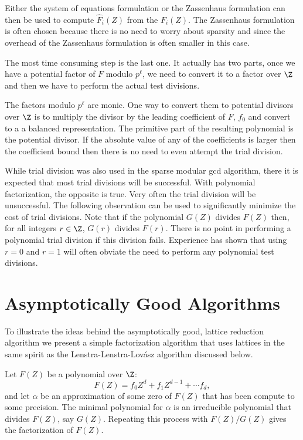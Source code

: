 Either the system of equations formulation or the Zassenhaus
formulation can then be used to compute $\hat{F}_i(Z)$ from the
$F_i(Z)$.  The Zassenhaus formulation is often chosen because there is
no need to worry about sparsity and since the overhead of the
Zassenhaus formulation is often smaller in this case.

The most time consuming step is the last one.  It actually has two
parts, once we have a potential factor of $F$ modulo $p^{\ell}$, we
need to convert it to a factor over $\Z$ and then we have to perform
the actual test divisions.

The factors modulo $p^{\ell}$ are monic.  One way to convert them to
potential divisors over $\Z$ is to multiply the divisor by the leading
coefficient of $F$, $f_0$ and convert to a a balanced representation.
The primitive part of the resulting polynomial is the potential
divisor.  If the absolute value of any of the coefficients is larger
then the coefficient bound then there is no need to even attempt the
trial division.

While trial division was also used in the sparse modular {\sc gcd}
algorithm, there it is expected that most trial divisions will be
successful.  With polynomial factorization, the opposite is true.
Very often the trial division will be unsuccessful.  The following
observation can be used to significantly minimize the cost of trial
divisions.  Note that if the polynomial $G(Z)$ divides $F(Z)$ then,
for all integers $r \in \Z$, $G(r)$ divides $F(r)$.  There is no point
in performing a polynomial trial division if this division fails.
Experience has shown \cite{Abbot85} that using $r= 0$ and $r=1$ will
often obviate the need to perform any polynomial test divisions.

\section{Asymptotically Good Algorithms}
\label{UF:LLL:Sec}

To illustrate the ideas behind the asymptotically good, lattice
reduction algorithm we present a simple factorization algorithm that
uses lattices in the same spirit as the Lenstra-Lenstra-Lov\'asz
algorithm discussed below.

Let $F(Z)$ be a polynomial over $\Z$:
\[
F(Z) = f_0 Z^d + f_1 Z^{d-1} + \cdots f_d,
\]
and let $\alpha$ be an approximation of some zero of $F(Z)$ that has
been compute to some precision.  The minimal polynomial for $\alpha$
is an irreducible polynomial that divides $F(Z)$, say $G(Z)$.
Repeating this process with $F(Z)/G(Z)$ gives the factorization of
$F(Z)$.

